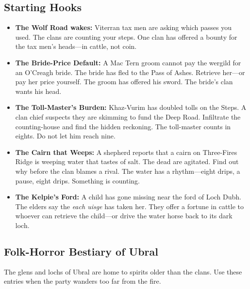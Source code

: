 \subsection*{Starting Hooks}
\begin{itemize}
\item \textbf{The Wolf Road wakes:} Viterran tax men are asking which passes you used. The clans are counting your steps. One clan has offered a bounty for the tax men's heads---in cattle, not coin.
\item \textbf{The Bride-Price Default:} A Mac Tern groom cannot pay the wergild for an O'Creagh bride. The bride has fled to the Pass of Ashes. Retrieve her---or pay her price yourself. The groom has offered his sword. The bride's clan wants his head.
\item \textbf{The Toll-Master's Burden:} Khaz-Vurim has doubled tolls on the Steps. A clan chief suspects they are skimming to fund the Deep Road. Infiltrate the counting-house and find the hidden reckoning. The toll-master counts in eights. Do not let him reach nine.
\item \textbf{The Cairn that Weeps:} A shepherd reports that a cairn on Three-Fires Ridge is weeping water that tastes of salt. The dead are agitated. Find out why before the clan blames a rival. The water has a rhythm---eight drips, a pause, eight drips. Something is counting.
\item \textbf{The Kelpie's Ford:} A child has gone missing near the ford of Loch Dubh. The elders say the \textit{each uisge} has taken her. They offer a fortune in cattle to whoever can retrieve the child---or drive the water horse back to its dark loch.
\end{itemize}

\subsection*{Folk-Horror Bestiary of Ubral}
\label{sec:ubral-bestiary}

The glens and lochs of Ubral are home to spirits older than the clans. Use these entries when the party wanders too far from the fire.

